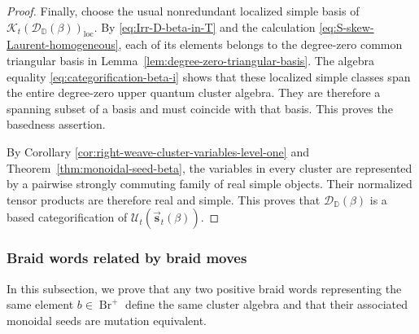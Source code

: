 \documentclass[12pt, reqno]{amsart}
\theoremstyle{plain}
\theoremstyle{definition}
\numberwithin{equation}{section}
\newcommand{\DD}{\mathbb{D}}
\begin{document}
\begin{proof}
Finally, choose the usual nonredundant localized simple basis of
\(\mathcal K_t(\mathscr D_{\DD}(\beta))_{\mathrm{loc}}\). By
\eqref{eq:Irr-D-beta-in-T} and the calculation
\eqref{eq:S-skew-Laurent-homogeneous}, each of its elements belongs to
the degree-zero common triangular basis in
Lemma~\ref{lem:degree-zero-triangular-basis}. The algebra equality
\eqref{eq:categorification-beta-i} shows that these localized simple
classes span the entire degree-zero upper quantum cluster algebra.
They are therefore a spanning subset of a basis and must coincide with
that basis. This proves the basedness assertion.

By Corollary
\ref{cor:right-weave-cluster-variables-level-one} and
Theorem~\ref{thm:monoidal-seed-beta}, the variables in every cluster
are represented by a pairwise strongly commuting family of real
simple objects. Their normalized tensor products are therefore real
and simple. This proves that
\(\mathscr D_{\DD}(\beta)\) is a based categorification of
\(\mathcal U_t(\overrightarrow{\mathbf s}_t(\beta))\).
\end{proof}

\subsubsection{Braid words related by braid moves}
In this subsection, we prove that any two positive braid words
representing the same element \(b\in\operatorname{Br}^{+}\) define
the same cluster algebra and that their associated monoidal seeds are
mutation equivalent. 
\end{document}
